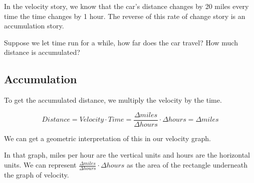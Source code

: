 \documentclass{ximera}
\begin{document}
In the velocity story, we know that the car's distance changes by 20 miles every time the time changes by 1 hour.  The reverse of this rate of change story is an accumulation story.

Suppose we let time run for a while, how far does the car travel?  How much distance is accumulated?



\subsection*{Accumulation}


To get the accumulated distance, we multiply the velocity by the time.

\[
Distance = Velocity \cdot Time = \frac{\Delta miles}{\Delta hours} \cdot \Delta hours = \Delta miles
\]


We can get a geometric interpretation of this in our velocity graph.




In that graph, miles per hour are the vertical units and hours are the horizontal units.  We can represent $\frac{\Delta miles}{\Delta hours} \cdot \Delta hours$ as the area of the rectangle underneath the graph of velocity.





\begin{image}
\end{image}
\end{document}
